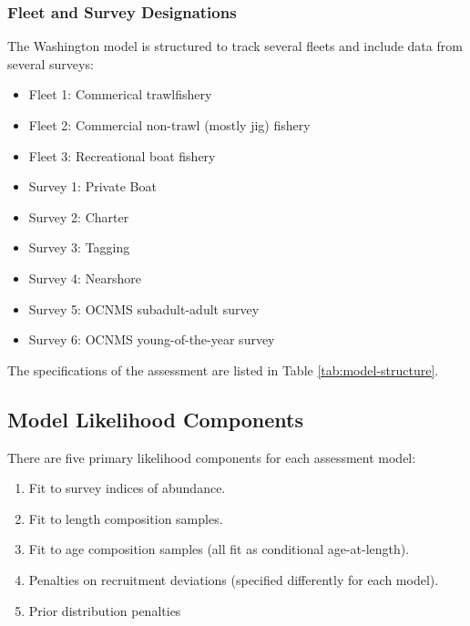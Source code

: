 \documentclass[11pt,
  english,
  letterpaper,
]{article}
\providecommand{\tightlist}{%
  \setlength{\itemsep}{0pt}\setlength{\parskip}{0pt}}
\providecommand{\tightlist}{%
  \setlength{\itemsep}{0pt}\setlength{\parskip}{0pt}}
\begin{document}
\hypertarget{fleet-and-survey-designations}{%
\subsubsection{Fleet and Survey Designations}\label{fleet-and-survey-designations}}

The Washington model is structured to track several fleets and include data from several surveys:

\begin{itemize}
\tightlist
\item
  Fleet 1: Commerical trawlfishery
\item
  Fleet 2: Commercial non-trawl (mostly jig) fishery
\item
  Fleet 3: Recreational boat fishery
\item
  Survey 1: Private Boat\\
\item
  Survey 2: Charter
\item
  Survey 3: Tagging
\item
  Survey 4: Nearshore
\item
  Survey 5: OCNMS subadult-adult survey
\item
  Survey 6: OCNMS young-of-the-year survey
\end{itemize}

The specifications of the assessment are listed in Table \ref{tab:model-structure}.

\hypertarget{model-likelihood-components}{%
\subsection{Model Likelihood Components}\label{model-likelihood-components}}

There are five primary likelihood components for each assessment model:

\begin{enumerate}
\def\labelenumi{\arabic{enumi}.}
\tightlist
\item
  Fit to survey indices of abundance.
\item
  Fit to length composition samples.
\item
  Fit to age composition samples (all fit as conditional age-at-length).\\
\item
  Penalties on recruitment deviations (specified differently for each model).
\item
  Prior distribution penalties
\end{enumerate}
\end{document}
